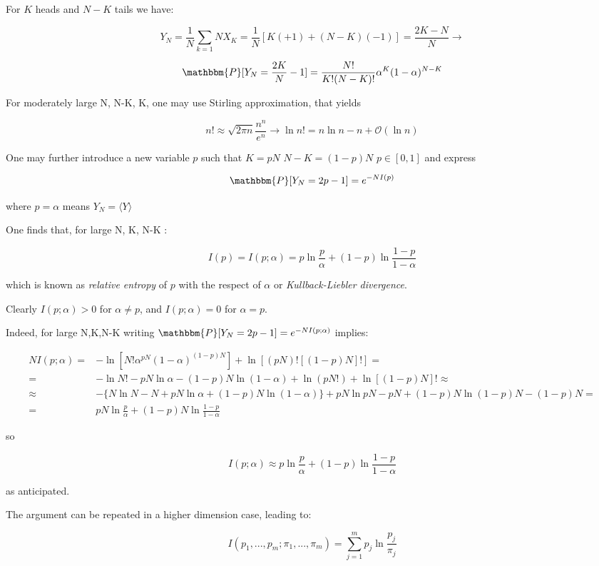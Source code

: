 \documentclass{article}
\begin{document}
For $K$ heads and $N-K$ tails we have:

$$Y_N = \frac{1}{N} \sum_{k=1}{N} X_K =  \frac{1}{N}[K(+1) + (N-K)(-1)] = \frac{2K-N}{N} \rightarrow $$

$$\mathbbm{P}[Y_N = \frac{2K}{N}-1] = \frac{N!}{K!(N-K)!} \alpha^K (1-\alpha)^{N-K}$$

For moderately large N, N-K, K, one may use Stirling approximation, that yields 

$$ n! \approx \sqrt{2 \pi n} \frac{n^n}{e^n} \rightarrow \ln n! = n \ln n - n + \mathcal{O}(\ln n)$$

One may further introduce a new variable $p$ such that $K = pN$ $N-K=(1-p)N$ $p \in [0,1]$ and express

$$\mathbbm{P}[Y_N = 2p-1] = e^{-N I(p)} $$

where $p=\alpha$ means $Y_N = \langle Y \rangle $

One finds that, for large N, K, N-K :

$$ I(p) = I(p;\alpha) = p \ln \frac{p}{\alpha} + (1-p) \ln \frac{1-p}{1-\alpha}$$

which is known as \emph{relative entropy} of $p$ with the respect of $\alpha$ or \emph{Kullback-Liebler divergence}.

Clearly $I(p;\alpha) > 0$ for $\alpha \neq p$, and  $I(p;\alpha) = 0$ for $\alpha=p$. 

Indeed, for large N,K,N-K writing $\mathbbm{P}[Y_N=2p-1] = e^{-NI(p;\alpha)}$ implies:

\begin{align*}
NI(p;\alpha) = & - \ln[ N! \alpha^{pN}(1-\alpha)^{(1-p)N}] + \ln[(pN)![(1-p)N]!] = \\
= & - \ln N! - pN \ln \alpha - (1-p)N \ln(1-\alpha) + \ln(pN!) + \ln[(1-p)N]! \approx \\
\approx & -\{ N\ln N - N + pN\ln \alpha + (1-p)N \ln (1-\alpha) \} + pN \ln pN - pN + (1-p)N \ln (1-p)N - (1-p)N = \\
= & pN \ln \frac{p}{\alpha} + (1-p)N \ln \frac{1-p}{1-\alpha}
\end{align*}

so

$$I(p;\alpha) \approx p \ln \frac{p}{\alpha} + (1-p) \ln \frac{1-p}{1-\alpha} $$

as anticipated.

The argument can be repeated in a higher dimension case, leading to:

$$I(p_1,...,p_m;\pi_1,...,\pi_m) = \sum_{j=1}^{m} p_j \ln \frac{p_j}{\pi_j}$$
\end{document}

